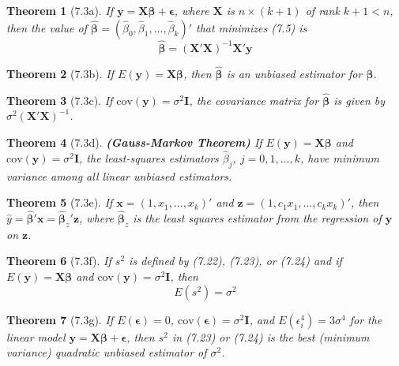 \documentclass{article}
\newtheorem{theorem}{Theorem}[section]
\begin{document}
\begin{theorem}[7.3a]
If $\mathbf{y} = \mathbf{X}\boldsymbol{\beta} + \boldsymbol{\epsilon}$, where $\mathbf{X}$ is $n \times (k+1)$ of rank $k+1 < n$, then the value of $\hat{\boldsymbol{\beta}} = (\hat{\beta}_0, \hat{\beta}_1, \ldots, \hat{\beta}_k)'$ that minimizes (7.5) is
\[\hat{\boldsymbol{\beta}} = (\mathbf{X}'\mathbf{X})^{-1}\mathbf{X}'\mathbf{y}\]
\end{theorem}

\begin{theorem}[7.3b]
If $E(\mathbf{y}) = \mathbf{X}\boldsymbol{\beta}$, then $\hat{\boldsymbol{\beta}}$ is an unbiased estimator for $\boldsymbol{\beta}$.
\end{theorem}

\begin{theorem}[7.3c]
If $\text{cov}(\mathbf{y}) = \sigma^2\mathbf{I}$, the covariance matrix for $\hat{\boldsymbol{\beta}}$ is given by $\sigma^2(\mathbf{X}'\mathbf{X})^{-1}$.
\end{theorem}

\begin{theorem}[7.3d] \textbf{(Gauss-Markov Theorem)}
If $E(\mathbf{y}) = \mathbf{X}\boldsymbol{\beta}$ and $\text{cov}(\mathbf{y}) = \sigma^2\mathbf{I}$, the least-squares estimators $\hat{\beta}_j$, $j = 0, 1, \ldots, k$, have minimum variance among all linear unbiased estimators.
\end{theorem}

\begin{theorem}[7.3e]
If $\mathbf{x} = (1, x_1, \ldots, x_k)'$ and $\mathbf{z} = (1, c_1x_1, \ldots, c_kx_k)'$, then $\hat{y} = \hat{\boldsymbol{\beta}}'\mathbf{x} = \hat{\boldsymbol{\beta}}_z'\mathbf{z}$, where $\hat{\boldsymbol{\beta}}_z$ is the least squares estimator from the regression of $\mathbf{y}$ on $\mathbf{z}$.
\end{theorem}

\begin{theorem}[7.3f]
If $s^2$ is defined by (7.22), (7.23), or (7.24) and if $E(\mathbf{y}) = \mathbf{X}\boldsymbol{\beta}$ and $\text{cov}(\mathbf{y}) = \sigma^2\mathbf{I}$, then
\[E(s^2) = \sigma^2\]
\end{theorem}

\begin{theorem}[7.3g]
If $E(\boldsymbol{\epsilon}) = 0$, $\text{cov}(\boldsymbol{\epsilon}) = \sigma^2\mathbf{I}$, and $E(\epsilon_i^4) = 3\sigma^4$ for the linear model $\mathbf{y} = \mathbf{X}\boldsymbol{\beta} + \boldsymbol{\epsilon}$, then $s^2$ in (7.23) or (7.24) is the best (minimum variance) quadratic unbiased estimator of $\sigma^2$.
\end{theorem}
\end{document}
